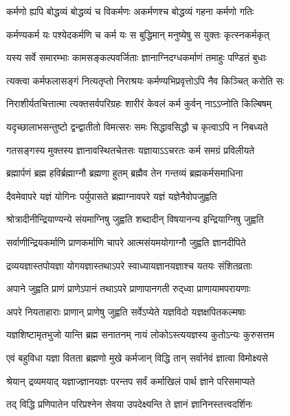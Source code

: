 \twolineshloka
{कर्मणो ह्यपि बोद्धव्यं बोद्धव्यं च विकर्मणः}
{अकर्मणश्च बोद्धव्यं गहना कर्मणो गतिः}%

\twolineshloka
{कर्मण्यकर्म यः पश्येदकर्मणि च कर्म यः}
{स बुद्धिमान् मनुष्येषु स युक्तः कृत्स्नकर्मकृत्}%

\twolineshloka
{यस्य सर्वे समारम्भाः कामसङ्कल्पवर्जिताः}
{ज्ञानाग्निदग्धकर्माणं तमाहुः पण्डितं बुधाः}%

\twolineshloka
{त्यक्त्वा कर्मफलासङ्गं नित्यतृप्तो निराश्रयः}
{कर्मण्यभिप्रवृत्तोऽपि नैव किञ्चित् करोति सः}%

\twolineshloka
{निराशीर्यतचित्तात्मा त्यक्तसर्वपरिग्रहः}
{शारीरं केवलं कर्म कुर्वन् नाऽऽप्नोति किल्बिषम्}%

\twolineshloka
{यदृच्छालाभसन्तुष्टो द्वन्द्वातीतो विमत्सरः}
{समः सिद्धावसिद्धौ च कृत्वाऽपि न निबध्यते}%

\twolineshloka
{गतसङ्गस्य मुक्तस्य ज्ञानावस्थितचेतसः}
{यज्ञायाऽऽचरतः कर्म समग्रं प्रविलीयते}%

\twolineshloka
{ब्रह्मार्पणं ब्रह्म हविर्ब्रह्माग्नौ ब्रह्मणा हुतम्}
{ब्रह्मैव तेन गन्तव्यं ब्रह्मकर्मसमाधिना}%

\twolineshloka
{दैवमेवापरे यज्ञं योगिनः पर्युपासते}
{ब्रह्माग्नावपरे यज्ञं यज्ञेनैवोपजुह्वति}%

\twolineshloka
{श्रोत्रादीनीन्द्रियाण्यन्ये संयमाग्निषु जुह्वति}
{शब्दादीन् विषयानन्य इन्द्रियाग्निषु जुह्वति}%

\twolineshloka
{सर्वाणीन्द्रियकर्माणि प्राणकर्माणि चापरे}
{आत्मसंयमयोगाग्नौ जुह्वति ज्ञानदीपिते}%

\twolineshloka
{द्रव्ययज्ञास्तपोयज्ञा योगयज्ञास्तथाऽपरे}
{स्वाध्यायज्ञानयज्ञाश्च यतयः संशितव्रताः}%

\twolineshloka
{अपाने जुह्वति प्राणं प्राणेऽपानं तथाऽपरे}
{प्राणापानगती रुद्‌ध्वा प्राणायामपरायणाः}%

\twolineshloka
{अपरे नियताहाराः प्राणान् प्राणेषु जुह्वति}
{सर्वेऽप्येते यज्ञविदो यज्ञक्षपितकल्मषाः}%

\twolineshloka
{यज्ञशिष्टामृतभुजो यान्ति ब्रह्म सनातनम्}
{नायं लोकोऽस्त्ययज्ञस्य कुतोऽन्यः कुरुसत्तम}%

\twolineshloka
{एवं बहुविधा यज्ञा वितता ब्रह्मणो मुखे}
{कर्मजान् विद्धि तान् सर्वानेवं ज्ञात्वा विमोक्ष्यसे}%

\twolineshloka
{श्रेयान् द्रव्यमयाद् यज्ञाज्ज्ञानयज्ञः परन्तप}
{सर्वं कर्माखिलं पार्थ ज्ञाने परिसमाप्यते}%

\twolineshloka
{तद् विद्धि प्रणिपातेन परिप्रश्नेन सेवया}
{उपदेक्ष्यन्ति ते ज्ञानं ज्ञानिनस्तत्त्वदर्शिनः}%

